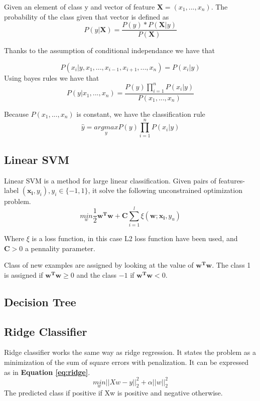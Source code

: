 Given an element of class y and vector of feature $\mathbf{X} = (x_1,...,x_n)$. The probability of the class given that vector is defined as 
\begin{equation}
	P(y | \mathbf{X}) = \frac{P(y)*P(\mathbf{X} | y)}{P(\mathbf{X})}
\end{equation}

Thanks to the assumption of conditional independance we have that 

\begin{equation}
	P(x_i |y,x_1, ...,x_{i-1},x_{i+1},...,x_n) = P(x_i | y)
\end{equation}
Using bayes rules we have that
\begin{equation}
	P(y|x_1,...,x_n) = \frac{P(y)\prod_{i=1}^n P(x_i | y)}{P(x_1,...,x_n)}
\end{equation}

Because $P(x_1,...,x_n)$ is constant, we have the classification rule 
\begin{equation}
	\hat{y} = \underset{y}{argmax} P(y)\prod_{i=1}^n P(x_i | y)
\end{equation}

\subsection{Linear SVM}
Linear SVM is a method for large linear classification. Given pairs of features-label $(\mathbf{x_i}, y_i), y_i \in \{-1, 1\}$, it solve the following unconstrained optimization problem. 
\begin{equation}
	\underset{w}{min} \frac{1}{2} \mathbf{w^Tw} + \mathbf{C} \sum_{i=1}^l \xi(\mathbf{w;x_i},y_u)
\end{equation}

Where $\xi$ is a loss function, in this case L2 loss function have been used, and $\mathbf{C} > 0$ a pennality parameter. 

Class of new examples are assigned by looking at the value of $\mathbf{w^Tw}$. The class 1 is assigned if $\mathbf{w^Tw} \geq 0$ and the class $-1$ if $\mathbf{w^Tw} < 0$.

\subsection{Decision Tree}
\subsection{Ridge Classifier}
Ridge classifier works the same way as ridge regression. It states the problem as a minimization of the sum of square errors with penalization. It can be expressed as in \textbf{Equation \ref{eq:ridge}}.
\begin{equation}
	\underset{w}{min} ||Xw-y||^2_2 + \alpha ||w||^2_2 \label{eq:ridge}
\end{equation}
The predicted class if positive if Xw is positive and negative otherwise. 
